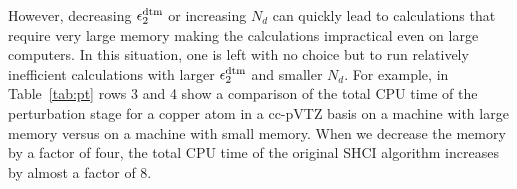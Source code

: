 \documentclass[%
reprint,
 superscriptaddress,
 amsmath,amssymb,
 aps,
]{revtex4-1}
\begin{document}
However, decreasing $\epsilon_2^{\rm dtm}$ or increasing $N_d$ can quickly lead to calculations that require very large memory
making the calculations impractical even on large computers. In this situation, one is left with no choice but to run relatively
inefficient calculations with larger $\epsilon_2^{\rm dtm}$ and smaller $N_d$.
For example, in Table~\ref{tab:pt} rows 3 and 4 show a comparison of the total CPU time of the perturbation stage
for a copper atom in a cc-pVTZ basis on a machine with large memory versus on a machine with small memory.
When we decrease the memory by a factor of four, the total CPU time of the original SHCI algorithm increases by almost a factor of 8.

\end{document}
